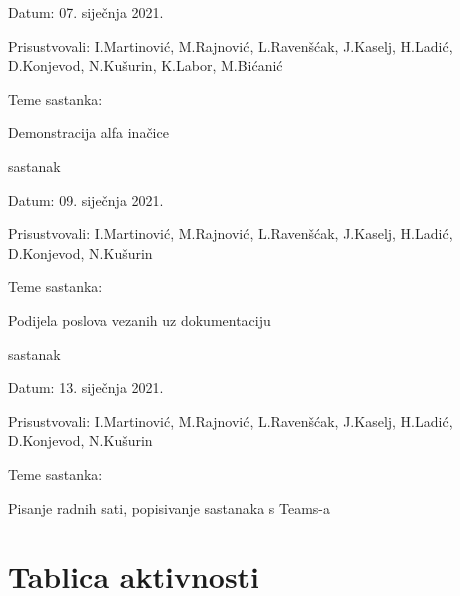 \begin{packed_enum}
\begin{packed_item}
	\item Datum: 07. siječnja 2021.
	\item Prisustvovali: I.Martinović, M.Rajnović, L.Ravenšćak, J.Kaselj, H.Ladić, D.Konjevod, N.Kušurin, K.Labor, M.Bićanić
	\item Teme sastanka: 
	\begin{packed_item}
		\item   Demonstracija alfa inačice
	\end{packed_item}
\end{packed_item}
\item sastanak
\item[] \begin{packed_item}
	\item Datum: 09. siječnja 2021.
	\item Prisustvovali: I.Martinović, M.Rajnović, L.Ravenšćak, J.Kaselj, H.Ladić, D.Konjevod, N.Kušurin
	\item Teme sastanka: 
	\begin{packed_item}
		\item   Podijela poslova vezanih uz dokumentaciju
	\end{packed_item}
\end{packed_item}
\item sastanak
\item[] \begin{packed_item}
	\item Datum: 13. siječnja 2021.
	\item Prisustvovali: I.Martinović, M.Rajnović, L.Ravenšćak, J.Kaselj, H.Ladić, D.Konjevod, N.Kušurin
	\item Teme sastanka: 
	\begin{packed_item}
		\item   Pisanje radnih sati, popisivanje sastanaka s Teams-a
	\end{packed_item}
\end{packed_item}
	
	
	
		
			
		\end{packed_enum}
		
			
		\eject
		\section*{Tablica aktivnosti}
		
